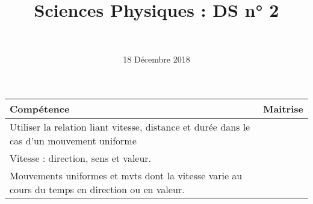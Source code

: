 \documentclass[a4paper,11pt]{exam}
\author{\ }
\date{18 Décembre 2018}
\title{Sciences Physiques : DS n° 2}
\begin{document}
%	


	\maketitle


\begin{small}
	\begin{center}
		\begin{tabular}{|@{\ }l@{}|@{\ }c@{\ }|}
			\hline
			\textbf{Compétence} & \textbf{Maitrise} \\
			\hline
			 Utiliser la relation liant vitesse, distance et durée dans le cas d’un mouvement uniforme \ \ &  \ \ \ \\
			\hline
			Vitesse : direction, sens et valeur. &  \\
			\hline			
			Mouvements uniformes et mvts dont la vitesse varie au cours du temps en direction ou en valeur.  &  \\
			\hline
			
		\end{tabular}
	\end{center}
\end{small}	
\vspace*{-0.5cm}	



%










%
%





\ \label{LastPage}
\end{document}

